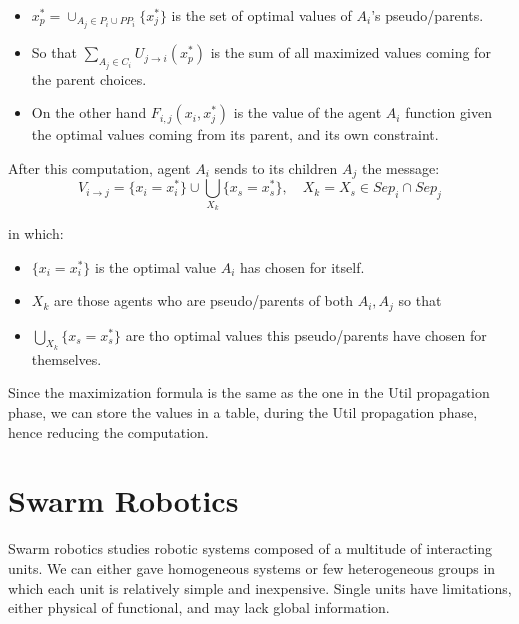 \documentclass[10pt,a4paper]{article}
\begin{document}
\begin{itemize}
\item $x_p^*=\cup_{A_j\in P_i \cup PP_i}\lbrace x_j^*\rbrace$ is the set of optimal values of $A_i$'s pseudo/parents.

\item So that $\sum_{A_j \in C_i}U_{j\rightarrow i}(x_p^*)$  is the sum of all maximized values coming for the parent choices.

\item On the other hand $F_{i,j}(x_i,x_j^*)$ is the value of the agent $A_i$ function given the optimal values coming from its parent, and its own constraint.

\end{itemize}

After this computation, agent $A_i$ sends to its children $A_j$ the message:
\[V_{i\rightarrow j}=\lbrace x_i=x_i^*\rbrace\cup \bigcup_{X_k}\lbrace x_s=x_s^*\rbrace,\quad X_k=X_s \in Sep_i \cap Sep_j \]

in which:
\begin{itemize}
\item $\lbrace x_i=x_i^*\rbrace$ is the optimal value $A_i$ has chosen for itself.
\item $X_k$ are those agents who are pseudo/parents of both $A_i,A_j$ so that
\item $\bigcup_{X_k}\lbrace x_s=x_s^*\rbrace$ are tho optimal values this pseudo/parents have chosen for themselves.
\end{itemize}

Since the maximization formula is the same as the one in the Util propagation phase, we can store the values in a table, during the Util propagation phase, hence reducing the computation.

\newpage

\section{Swarm Robotics}
\label{sec:swarm_robotic}
Swarm robotics studies robotic systems composed of a multitude of interacting units. We can either gave homogeneous systems or few heterogeneous groups in which each unit is relatively simple and inexpensive.
Single units have limitations, either physical of functional, and may lack global information.
\end{document}
